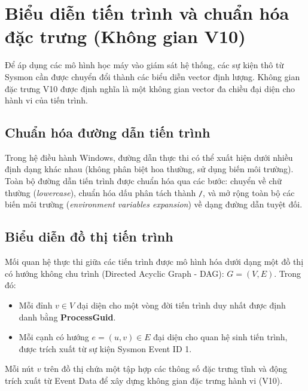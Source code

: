 \documentclass[../main.tex]{subfiles}
\begin{document}
\section{Biểu diễn tiến trình và chuẩn hóa đặc trưng (Không gian V10)}
\label{section:1.2}

Để áp dụng các mô hình học máy vào giám sát hệ thống, các sự kiện thô từ Sysmon cần được chuyển đổi thành các biểu diễn vector định lượng. Không gian đặc trưng V10 được định nghĩa là một không gian vector đa chiều đại diện cho hành vi của tiến trình.

\subsection{Chuẩn hóa đường dẫn tiến trình}
\label{subsection:1.2.1}
Trong hệ điều hành Windows, đường dẫn thực thi có thể xuất hiện dưới nhiều định dạng khác nhau (không phân biệt hoa thường, sử dụng biến môi trường). Toàn bộ đường dẫn tiến trình được chuẩn hóa qua các bước: chuyển về chữ thường (\textit{lowercase}), chuẩn hóa dấu phân tách thành \texttt{/}, và mở rộng toàn bộ các biến môi trường (\textit{environment variables expansion}) về dạng đường dẫn tuyệt đối.

\subsection{Biểu diễn đồ thị tiến trình}
\label{subsection:1.2.2}
Mối quan hệ thực thi giữa các tiến trình được mô hình hóa dưới dạng một đồ thị có hướng không chu trình (Directed Acyclic Graph - DAG): $G = (V, E)$. Trong đó:
\begin{itemize}
    \item Mỗi đỉnh $v \in V$ đại diện cho một vòng đời tiến trình duy nhất được định danh bằng \textbf{ProcessGuid}.
    \item Mỗi cạnh có hướng $e = (u, v) \in E$ đại diện cho quan hệ sinh tiến trình, được trích xuất từ sự kiện Sysmon Event ID 1.
\end{itemize}
Mỗi nút $v$ trên đồ thị chứa một tập hợp các thông số đặc trưng tĩnh và động trích xuất từ Event Data để xây dựng không gian đặc trưng hành vi (V10).
\end{document}
